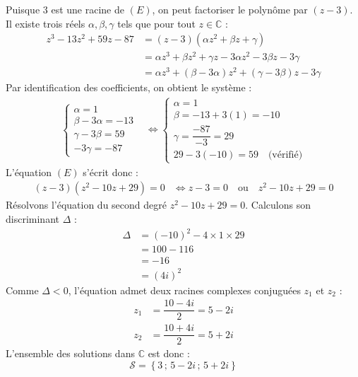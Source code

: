 \documentclass[12pt,a4paper]{article}
\begin{document}
\begin{enumerate}
\begin{enumerate}
        Puisque $3$ est une racine de $(E)$, on peut factoriser le polynôme par $(z - 3)$. Il existe trois réels $\alpha, \beta, \gamma$ tels que pour tout $z \in \mathbb{C}$ :
        $$
        \begin{aligned}
            z^3 - 13z^2 + 59z - 87 &= (z - 3)(\alpha z^2 + \beta z + \gamma) \\
            &= \alpha z^3 + \beta z^2 + \gamma z - 3\alpha z^2 - 3\beta z - 3\gamma \\
            &= \alpha z^3 + (\beta - 3\alpha)z^2 + (\gamma - 3\beta)z - 3\gamma
        \end{aligned}
        $$
        Par identification des coefficients, on obtient le système :
        $$
        \begin{aligned}
            \left\{
            \begin{array}{l}
                \alpha = 1 \\
                \beta - 3\alpha = -13 \\
                \gamma - 3\beta = 59 \\
                -3\gamma = -87
            \end{array}
            \right.
            &\iff
            \left\{
            \begin{array}{l}
                \alpha = 1 \\
                \beta = -13 + 3(1) = -10 \\
                \gamma = \dfrac{-87}{-3} = 29 \\
                29 - 3(-10) = 59 \quad \text{(vérifié)}
            \end{array}
            \right.
        \end{aligned}
        $$
        L'équation $(E)$ s'écrit donc :
        $$
        \begin{aligned}
            (z - 3)(z^2 - 10z + 29) = 0 &\iff z - 3 = 0 \quad \text{ou} \quad z^2 - 10z + 29 = 0
        \end{aligned}
        $$
        Résolvons l'équation du second degré $z^2 - 10z + 29 = 0$. Calculons son discriminant $\Delta$ :
        $$
        \begin{aligned}
            \Delta &= (-10)^2 - 4 \times 1 \times 29 \\
            &= 100 - 116 \\
            &= -16 \\
            &= (4i)^2
        \end{aligned}
        $$
        Comme $\Delta < 0$, l'équation admet deux racines complexes conjuguées $z_1$ et $z_2$ :
        $$
        \begin{aligned}
            z_1 &= \dfrac{10 - 4i}{2} = 5 - 2i \\
            z_2 &= \dfrac{10 + 4i}{2} = 5 + 2i
        \end{aligned}
        $$
        L'ensemble des solutions dans $\mathbb{C}$ est donc :
        $$
        \mathcal{S} = \left\{ 3 \,;\, 5 - 2i \,;\, 5 + 2i \right\}
        $$
    \end{enumerate}


\end{enumerate}
\end{document}
